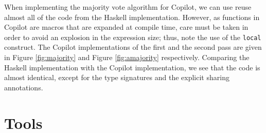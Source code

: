 \begin{figure*}[ht]
\caption{The second pass of the majority vote algorithm in Copilot.}
\label{fig:amajority}
\end{figure*}

When implementing the majority vote algorithm for Copilot, we can use reuse
almost all of the code from the Haskell implementation. However, as functions in
Copilot are macros that are expanded at compile time, care must be taken in
order to avoid an explosion in the expression size; thus, note the use of the
{\tt local} construct.  The Copilot implementations of the first and the second
pass are given in Figure \ref{fig:majority} and Figure \ref{fig:amajority}
respectively. Comparing the Haskell implementation with the Copilot
implementation, we see that the code is almost identical, except for the type
signatures and the explicit sharing annotations.


\section{Tools} \label{sec:tools}


